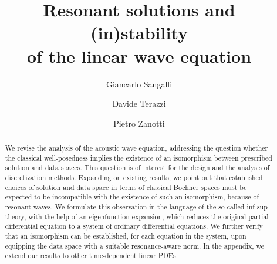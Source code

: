 \documentclass{amsart}
\theoremstyle{plain}
\theoremstyle{remark}
\numberwithin{equation}{section}
\numberwithin{theorem}{section}
\begin{document}
	
	\title[Resonant solutions and (in)stability of the linear wave equation]{Resonant solutions and (in)stability\\ of the linear wave equation}
	
	\author[G. Sangalli]{Giancarlo Sangalli}
	\address{Università degli Studi di Pavia, Dipartimento di Matematica,  27100 Pavia, Italy \newline
    \hspace*{1.5em}Istituto di Matematica Applicata e Tecnologie Informatiche, ``E. Magenes" -- CNR, 27100 Pavia, Italy.}
	
	\author[D.~Terazzi]{Davide Terazzi}
	\address{Università di Milano Bicocca, Dipartimento di Matematica e Applicazioni, 20125 Milano, Italy}
	
	\author[P.~Zanotti]{Pietro Zanotti}
	\address{Universit\`{a} degli Studi di Milano, Dipartimento di Matematica, 20131, Milano, Italy}
	
	
	
	
	\begin{abstract}
	We revise the analysis of the acoustic wave equation, addressing the question whether the classical well-posedness implies the existence of an isomorphism between prescribed solution and data spaces. This question is of interest for the design and the analysis of discretization methods. Expanding on existing results, we point out that established choices of solution and data space in terms of classical Bochner spaces must be expected to be incompatible with the existence of such an isomorphism, because of resonant waves. We formulate this observation in the language of the so-called inf-sup theory, with the help of an eigenfunction expansion, which reduces the original partial differential equation to a system of ordinary differential equations. We further verify that an isomorphism can be established, for each equation in the system, upon equipping the data space with a suitable resonance-aware norm. In the appendix, we extend our results to other time-dependent linear PDEs.
	\end{abstract} 
	
\end{document}
